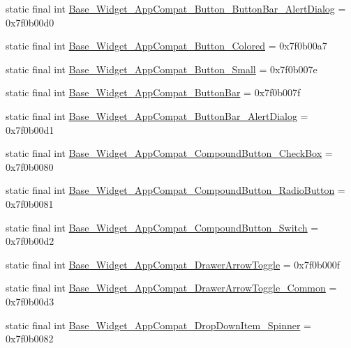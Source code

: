 \begin{CompactItemize}
\item 
static final int \hyperlink{classandroid_1_1support_1_1graphics_1_1drawable_1_1animated_1_1_r_1_1style_1ca62dbe4ee424e4200439740009a840}{Base\_\-Widget\_\-AppCompat\_\-Button\_\-ButtonBar\_\-AlertDialog} = 0x7f0b00d0
\item 
static final int \hyperlink{classandroid_1_1support_1_1graphics_1_1drawable_1_1animated_1_1_r_1_1style_49d246ace60d407cfb5594c93cf1da48}{Base\_\-Widget\_\-AppCompat\_\-Button\_\-Colored} = 0x7f0b00a7
\item 
static final int \hyperlink{classandroid_1_1support_1_1graphics_1_1drawable_1_1animated_1_1_r_1_1style_d8a0012b661b3b58161337ff3b987c68}{Base\_\-Widget\_\-AppCompat\_\-Button\_\-Small} = 0x7f0b007e
\item 
static final int \hyperlink{classandroid_1_1support_1_1graphics_1_1drawable_1_1animated_1_1_r_1_1style_2fb6342ab73e96d31e7c73a72e948af2}{Base\_\-Widget\_\-AppCompat\_\-ButtonBar} = 0x7f0b007f
\item 
static final int \hyperlink{classandroid_1_1support_1_1graphics_1_1drawable_1_1animated_1_1_r_1_1style_5f59019714b9f0736e2423ef29543e62}{Base\_\-Widget\_\-AppCompat\_\-ButtonBar\_\-AlertDialog} = 0x7f0b00d1
\item 
static final int \hyperlink{classandroid_1_1support_1_1graphics_1_1drawable_1_1animated_1_1_r_1_1style_67d8ffb715399ac28f7b5bc6746f8ba2}{Base\_\-Widget\_\-AppCompat\_\-CompoundButton\_\-CheckBox} = 0x7f0b0080
\item 
static final int \hyperlink{classandroid_1_1support_1_1graphics_1_1drawable_1_1animated_1_1_r_1_1style_6bbff27c66d1d03bdd0f8d98f5db1439}{Base\_\-Widget\_\-AppCompat\_\-CompoundButton\_\-RadioButton} = 0x7f0b0081
\item 
static final int \hyperlink{classandroid_1_1support_1_1graphics_1_1drawable_1_1animated_1_1_r_1_1style_24f43b9052ff834003429d583ffe8764}{Base\_\-Widget\_\-AppCompat\_\-CompoundButton\_\-Switch} = 0x7f0b00d2
\item 
static final int \hyperlink{classandroid_1_1support_1_1graphics_1_1drawable_1_1animated_1_1_r_1_1style_b6b97dcde9892137672cf5fcc8fea749}{Base\_\-Widget\_\-AppCompat\_\-DrawerArrowToggle} = 0x7f0b000f
\item 
static final int \hyperlink{classandroid_1_1support_1_1graphics_1_1drawable_1_1animated_1_1_r_1_1style_2b11f412a0c71f0596edabf208b99e2d}{Base\_\-Widget\_\-AppCompat\_\-DrawerArrowToggle\_\-Common} = 0x7f0b00d3
\item 
static final int \hyperlink{classandroid_1_1support_1_1graphics_1_1drawable_1_1animated_1_1_r_1_1style_27856d8f5ebc8769d7d013884f12143e}{Base\_\-Widget\_\-AppCompat\_\-DropDownItem\_\-Spinner} = 0x7f0b0082

\end{CompactItemize}
